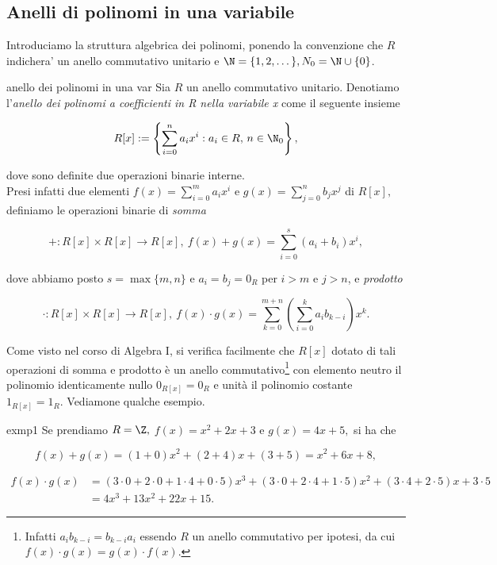 
\vspace{1.75mm}
\subsection{Anelli di polinomi in una variabile}

Introduciamo la struttura algebrica dei polinomi, ponendo la convenzione che 
$R$ indichera' un anello commutativo unitario e $\N = \{1,2,\dots\}, N_0 = \N\cup\{0\}$.

\begin{defn}{anello dei polinomi in una var}
Sia $R$ un anello commutativo unitario. Denotiamo l'\emph{anello dei polinomi a coefficienti in R
nella variabile x} come il seguente insieme 

\[ R[x]:=\left\{\sum\limits_{i=0}^n a_i x^i : a_i\in R,\, n\in \N_0\right\}, \]

\noindent dove sono definite due operazioni binarie interne. \\
Presi infatti due elementi 
$f(x)=\sum\limits_{i=0}^m a_i x^i$ e $g(x)=\sum\limits_{j=0}^n b_j x^j$ di $R[x],$ 
definiamo le operazioni binarie di \emph{somma} 

\[ + : R[x] \times R[x] \to R[x],\ f(x)+g(x)=\sum\limits_{i=0}^s (a_i+b_i)x^i, \] 

\noindent dove abbiamo posto $s=\max\{m,n\}$ e $a_i=b_j=0_R$ per $i>m$ e $j>n$, e \emph{prodotto}

\[ \cdot : R[x] \times R[x] \to R[x],\ f(x)\cdot g(x)=\sum\limits_{k=0}^{m+n} \left(\sum\limits_{i=0}^{k}a_i b_{k-i}\right) x^k.\] 
\end{defn}

\noindent Come visto nel corso di Algebra I, si verifica facilmente che $R[x]$ dotato di tali operazioni di somma e prodotto 
è un anello commutativo\footnote{Infatti $a_ib_{k-i}=b_{k-i}a_i$ essendo $R$ un anello commutativo per ipotesi, 
da cui $f(x)\cdot g(x)=g(x)\cdot f(x)$.} con elemento neutro il polinomio identicamente nullo $0_{R[x]}=0_{R}$ 
e unità il polinomio costante $1_{R[x]}=1_{R}$. Vediamone qualche esempio.


\begin{example}[]{exmp1}
Se prendiamo $R=\Z,$ $f(x)=x^2+2x+3$ e $g(x)=4x+5,$ si ha che 

\[ f(x)+g(x)=(1+0)x^2+(2+4)x+(3+5)=x^2+6x+8, \] 

{\setlength{\belowdisplayskip}{-2pt}\setlength{\abovedisplayskip}{0pt}
\begin{align*}
f(x)\cdot g(x) 
  &= (3\cdot 0+2\cdot 0+1\cdot 4+0\cdot 5)x^3+(3\cdot 0+2\cdot 4+1\cdot 5)x^2+(3\cdot 4+2\cdot 5)x+3\cdot 5 \\ 
  &= 4x^3+13x^2+22x+15. \ 
\end{align*}}
\end{example}


